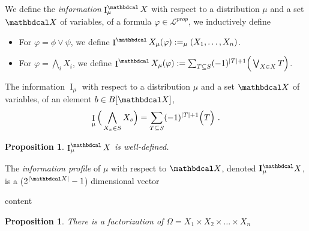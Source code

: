 \documentclass{article}
\theoremstyle{plain}
\newtheorem{prop}[theorem]{Proposition}
\theoremstyle{definition}
\theoremstyle{remark}
\let\H\relax
\DeclareMathOperator{\H}{\mathrm{H}} %
\DeclareMathOperator{\I}{\mathrm{I}} %
\newcommand{\mat}[1]{\mathbf{#1}}
\newcommand{\N}{\mathbdcal X}
\newcommand\lang[1]{\mathcal L^{#1}}
\begin{document}
\begin{defn}
	We define the \emph{information} $\I_\mu^\N$ with respect to a distribution $\mu$ and a set $\N$ of variables, of a formula $\varphi \in \lang{prop}$, we inductively define
			\begin{itemize}[itemsep=0pt, parsep=1pt]
				\item For $\varphi = \phi \lor \psi$, we define $\I^\N_\mu(\varphi) := \H_\mu(X_1, \ldots, X_n)$.
				\item For $\varphi = \bigwedge_i X_i$, we define $\I^\N_\mu(\varphi)
					 := \sum_{T \subseteq S} (-1)^{|T|+1} \H\Big(\bigvee_{X \in X} T\Big)$.
			\end{itemize}
\end{defn}
	
	\begin{defn}
		The information $\I_\mu$ with respect to a distribution $\mu$ and a set $\N$ of variables, of an element $b \in B[\N]$, 
	\[			\I_\mu\Big(\bigwedge_{X_x \in S} X_s\Big) =  \sum_{T \subseteq S} (-1)^{|T|+1} \H\Big( T \Big) ~. \]
	\end{defn}

	\begin{prop}
		$\I_\mu^\N$ is well-defined.
	\end{prop}

	\begin{defn}
		The \emph{information profile} of $\mu$ with respect to $\N$, denoted $\mat I_\mu^\N$, is a ($2^{|\N|} -1$) dimensional vector 
	\end{defn}

	\begin{example}
		content
	\end{example}
	

		
	\begin{prop}
		There is a factorization of $\Omega = X_1 \times X_2 \times \ldots \times X_n$ 
	\end{prop}
\end{document}
